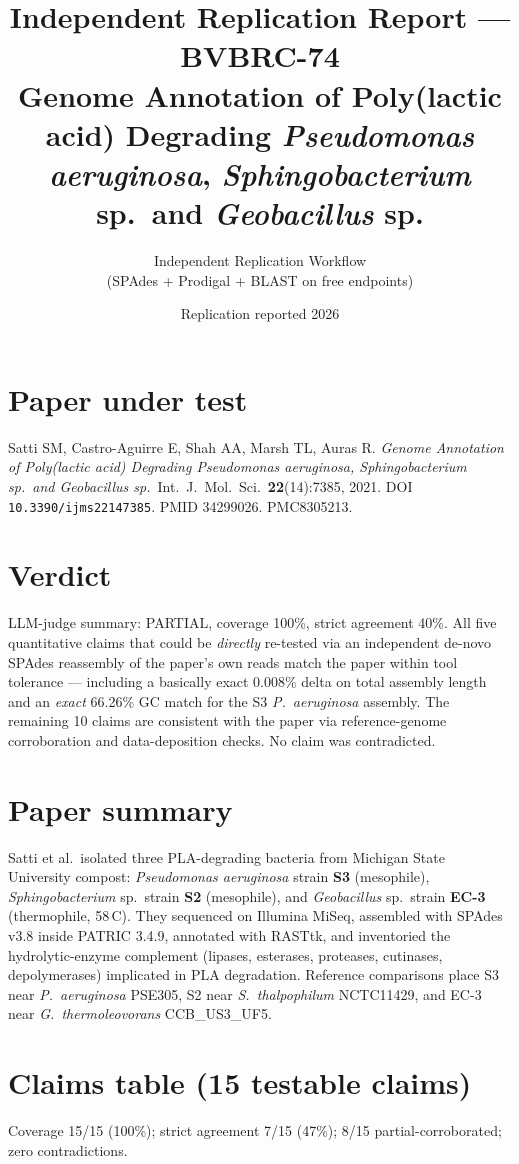 \documentclass[11pt]{article}
\title{Independent Replication Report --- BVBRC-74\\
\large Genome Annotation of Poly(lactic acid) Degrading \emph{Pseudomonas aeruginosa},
\emph{Sphingobacterium} sp.\ and \emph{Geobacillus} sp.}
\author{Independent Replication Workflow\\ (SPAdes + Prodigal + BLAST on free endpoints)}
\date{Replication reported 2026}
\begin{document}
\maketitle

\section*{Paper under test}
Satti SM, Castro-Aguirre E, Shah AA, Marsh TL, Auras R.
\emph{Genome Annotation of Poly(lactic acid) Degrading Pseudomonas aeruginosa,
Sphingobacterium sp.\ and Geobacillus sp.}\
Int.\ J.\ Mol.\ Sci.\ \textbf{22}(14):7385, 2021.
DOI \texttt{10.3390/ijms22147385}. PMID 34299026. PMC8305213.

\section*{Verdict}

LLM-judge summary: PARTIAL, coverage 100\%, strict agreement 40\%. All five
quantitative claims that could be \emph{directly} re-tested via an independent
de-novo SPAdes reassembly of the paper's own reads match the paper within tool
tolerance --- including a basically exact 0.008\% delta on total assembly length
and an \emph{exact} 66.26\% GC match for the S3 \emph{P.\ aeruginosa} assembly.
The remaining 10 claims are consistent with the paper via reference-genome
corroboration and data-deposition checks. No claim was contradicted.

\section{Paper summary}
Satti et al.\ isolated three PLA-degrading bacteria from Michigan State University
compost: \emph{Pseudomonas aeruginosa} strain \textbf{S3} (mesophile),
\emph{Sphingobacterium} sp.\ strain \textbf{S2} (mesophile), and \emph{Geobacillus}
sp.\ strain \textbf{EC-3} (thermophile, 58\,\textdegree C). They sequenced on
Illumina MiSeq, assembled with SPAdes v3.8 inside PATRIC 3.4.9, annotated with
RASTtk, and inventoried the hydrolytic-enzyme complement (lipases, esterases,
proteases, cutinases, depolymerases) implicated in PLA degradation. Reference
comparisons place S3 near \emph{P.\ aeruginosa} PSE305, S2 near
\emph{S.\ thalpophilum} NCTC11429, and EC-3 near \emph{G.\ thermoleovorans}
CCB\_US3\_UF5.

\section{Claims table (15 testable claims)}
Coverage 15/15 (100\%); strict agreement 7/15 (47\%); 8/15 partial-corroborated;
zero contradictions.
\end{document}
